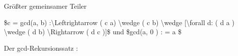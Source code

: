 \documentclass[a4paper]{article}
\begin{document}
\begin{multicols}{3}

      Größter gemeinsamer Teiler

      \begin{itemize*}
            \item
            \$c = gcd(a, b) :\textbackslash Leftrightarrow ( c \textbar{} a)
            \textbackslash wedge ( c \textbar{} b) \textbackslash wedge
            {[}\textbackslash forall d: ( d \textbar{} a ) \textbackslash wedge (
            d \textbar{} b) \textbackslash Rightarrow ( d \textbar{} c ){]}\$ und
            \$gcd(a, 0 ) : = \textbar{} a \textbar\$
            \item
            Der gcd-Rekursionssatz :


\end{itemize*}
\end{multicols}
\end{document}
